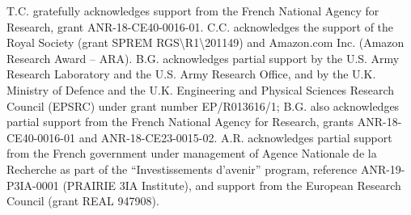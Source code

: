 T.C. gratefully acknowledges support from the French National Agency for Research, grant ANR-18-CE40-0016-01.
C.C. acknowledges the support of the Royal Society (grant SPREM RGS\textbackslash{}R1\textbackslash{}201149) and Amazon.com Inc. (Amazon Research Award – ARA).
B.G. acknowledges partial support by the U.S. Army Research Laboratory and the U.S. Army Research Office, and by the U.K. Ministry of Defence and the U.K. Engineering and Physical Sciences Research Council (EPSRC) under grant number EP/R013616/1; B.G. also acknowledges partial support from the French National Agency for Research, grants ANR-18-CE40-0016-01 and ANR-18-CE23-0015-02. 
A.R. acknowledges partial support from the French government under management of Agence Nationale de la Recherche as part of the “Investissements d’avenir” program, reference ANR-19-P3IA-0001 (PRAIRIE 3IA Institute), and support from the European Research Council (grant REAL 947908).